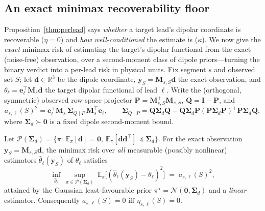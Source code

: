 \subsection*{An exact minimax recoverability floor}
\label{sec:floor}
Proposition~\ref{thm:perlead} says \emph{whether} a target lead's dipolar coordinate is recoverable
($\eta{=}0$) and \emph{how well-conditioned} the estimate is ($\kappa$). We now give the \emph{exact}
minimax risk of estimating the target's dipolar functional from the exact (noise-free) observation,
over a second-moment class of dipole priors---turning the binary verdict into a per-lead risk in
physical units. Fix segment $s$ and observed set $S$; let $\bm d\in\mathbb R^3$ be the dipole
coordinate, $\bm y_S=\bm M_{s,S}\bm d$ the exact observation, and $\theta_\ell=\bm e_\ell^\top\bm M_s
\bm d$ the target dipolar functional of lead $\ell$. Write the (orthogonal, symmetric) observed
row-space projector $\bm P=\bm M_{s,S}^{+}\bm M_{s,S}$, $\bm Q=\bm I-\bm P$, and
\[
a_{s,\ell}(S)^2 = \bm e_\ell^\top\bm M_s\,\bm\Sigma_{Q\mid P}\,\bm M_s^\top\bm e_\ell,
\qquad
\bm\Sigma_{Q\mid P}=\bm Q\bm\Sigma_d\bm Q-\bm Q\bm\Sigma_d\bm P(\bm P\bm\Sigma_d\bm P)^{+}\bm P\bm\Sigma_d\bm Q ,
\]
where $\bm\Sigma_d\succ\bm0$ is a fixed dipole second-moment bound.

\begin{theoremc}\label{thm:floor}
Let $\mathcal P(\bm\Sigma_d)=\{\pi:\ \mathbb E_\pi[\bm d]=\bm0,\ \mathbb E_\pi[\bm d\bm d^\top]\preceq
\bm\Sigma_d\}$. For the exact observation $\bm y_S=\bm M_{s,S}\bm d$, the minimax risk over \emph{all}
measurable (possibly nonlinear) estimators $\hat\theta_\ell(\bm y_S)$ of $\theta_\ell$ satisfies
\[
\inf_{\hat\theta_\ell}\ \sup_{\pi\in\mathcal P(\bm\Sigma_d)}\
\mathbb E_\pi\big[(\hat\theta_\ell(\bm y_S)-\theta_\ell)^2\big]\;=\;a_{s,\ell}(S)^2,
\]
attained by the Gaussian least-favourable prior $\pi^\star=\mathcal N(\bm0,\bm\Sigma_d)$ and a
\emph{linear} estimator. Consequently $a_{s,\ell}(S)=0$ iff $\eta_{s,\ell}(S)=0$.
\end{theoremc}

